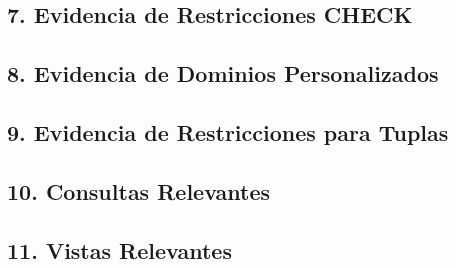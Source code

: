 \documentclass[12pt]{article}
\begin{document}
    \subsection*{7. Evidencia de Restricciones CHECK}
    
    \subsection*{8. Evidencia de Dominios Personalizados}
    
    \subsection*{9. Evidencia de Restricciones para Tuplas}
    
    \subsection*{10. Consultas Relevantes}
    
    \subsection*{11. Vistas Relevantes}
\end{document}
